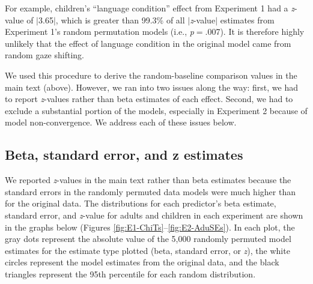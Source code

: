 \documentclass[authoryear, 12pt]{elsarticle}
\begin{document}
For example, children's ``language condition'' effect from Experiment 1 had a \textit{z}-value of $|$3.65$|$, which is greater than 99.3\% of all $|$\textit{z}-value$|$ estimates from Experiment 1's random permutation models (i.e., \textit{p}$=$.007). It is therefore highly unlikely that the effect of language condition in the original model came from random gaze shifting.

We used this procedure to derive the random-baseline comparison values in the main text (above). However, we ran into two issues along the way: first, we had to report \textit{z}-values rather than beta estimates of each effect. Second, we had to exclude a substantial portion of the models, especially in Experiment 2 because of model non-convergence. We address each of these issues below.

\subsection{Beta, standard error, and z estimates}
We reported \textit{z}-values in the main text rather than beta estimates because the standard errors in the randomly permuted data models were much higher than for the original data. The distributions for each predictor's beta estimate, standard error, and \textit{z}-value for adults and children in each experiment are shown in the graphs below (Figures \ref{fig:E1-ChiTs}--\ref{fig:E2-AduSEs}). In each plot, the gray dots represent the absolute value of the 5,000 randomly permuted model estimates for the estimate type plotted (beta, standard error, or \textit{z}), the white circles represent the model estimates from the original data, and the black triangles represent the 95th percentile for each random distribution.
\end{document}

